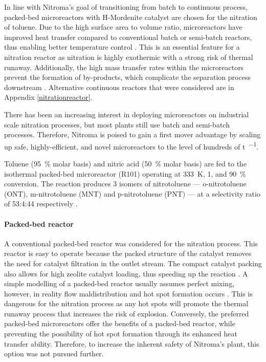 In line with Nitroma's goal of transitioning from batch to continuous process, packed-bed microreactors with H-Mordenite catalyst are chosen for the nitration of toluene. Due to the high surface area to volume ratio, microreactors have improved heat transfer compared to conventional batch or semi-batch reactors, thus enabling better temperature control \cite{halder_nitration_2007}. This is an essential feature for a nitration reactor as nitration is highly exothermic with a strong risk of thermal runaway. Additionally, the high mass transfer rates within the microreactors prevent the formation of by-products, which complicate the separation process downstream \cite{halder_nitration_2007}.
Alternative continuous reactors that were considered are in Appendix \ref{nitrationreactor}. 

There has been an increasing interest in deploying microreactors on industrial scale nitration processes, but most plants still use batch and semi-batch processes. Therefore, Nitroma is poised to gain a first mover advantage by scaling up safe, highly-efficient, and novel microreactors to the level of hundreds of \si{\tonne\per\year}.

Toluene (\SI{95}{\percent} molar basis) and nitric acid (\SI{50}{\percent} molar basis) are fed to the isothermal packed-bed microreactor (R101) operating at \SI{333}{\K}, \SI{1}{\atm}, and \SI{90}{\percent} conversion. The reaction produces 3 isomers of nitrotoluene --- o-nitrotoluene (ONT), m-nitrotoluene (MNT) and p-nitrotoluene (PNT) --- at a selectivity ratio of 53:4:44 respectively \cite{smith_novel_1998}.


\paragraph{Packed-bed reactor}
A conventional packed-bed reactor was considered for the nitration process. This reactor is easy to operate because the packed structure of the catalyst removes the need for catalyst filtration in the outlet stream. The compact catalyst packing also allows for high zeolite catalyst loading, thus speeding up the reaction \cite{kashid_microstructured_2009}. A simple modelling of a packed-bed reactor usually assumes perfect mixing, however, in reality flow maldistribution and hot spot formation occurs \cite{nguyen_flow_1994}. This is dangerous for the nitration process as any hot spots will promote the thermal runaway process that increases the risk of explosion. Conversely, the preferred packed-bed microreactors offer the benefits of a packed-bed reactor, while preventing the possibility of hot spot formation through its enhanced heat transfer ability. Therefore, to increase the inherent safety of Nitroma's plant, this option was not pursued further.

